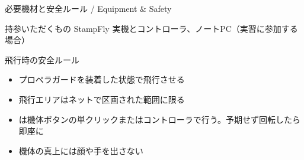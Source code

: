 \begin{frame}{必要機材と安全ルール / Equipment \& Safety}
  \begin{block}{持参いただくもの}
    \small StampFly 実機とコントローラ、ノートPC（実習に参加する場合）
  \end{block}

  \vspace{0.5em}

  \begin{alertblock}{飛行時の安全ルール}
    \begin{itemize}\small\setlength{\itemsep}{2pt}
      \item プロペラガードを装着した状態で飛行させる
      \item 飛行エリアはネットで区画された範囲に限る
      \item {} は機体ボタンの単クリックまたはコントローラで行う。予期せず回転したら即座に 
      \item 機体の真上には顔や手を出さない
    \end{itemize}
  \end{alertblock}
\end{frame}
